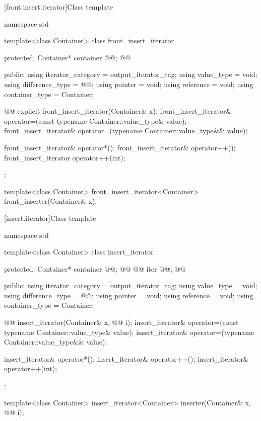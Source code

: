 [front.insert.iterator]{Class template }



%
\begin{codeblock}
namespace std {
  template<class Container>
  class front_insert_iterator {
  protected:
    Container* container @@; @\added{// \expos}@

  public:
    using iterator_category = output_iterator_tag;
    using value_type        = void;
    using difference_type   = @@;
    using pointer           = void;
    using reference         = void;
    using container_type    = Container;

    @@
    explicit front_insert_iterator(Container& x);
    front_insert_iterator& operator=(const typename Container::value_type& value);
    front_insert_iterator& operator=(typename Container::value_type&& value);

    front_insert_iterator& operator*();
    front_insert_iterator& operator++();
    front_insert_iterator  operator++(int);
  };

  template<class Container>
    front_insert_iterator<Container> front_inserter(Container& x);
}
\end{codeblock}


[insert.iterator]{Class template }


%
\begin{codeblock}
namespace std {
  template<class Container>
  class insert_iterator {
  protected:
    Container* container @@; @\added{// \expos}@
    @@ iter @\added{\{\}}@; @\added{// \expos}@

  public:
    using iterator_category = output_iterator_tag;
    using value_type        = void;
    using difference_type   = @@;
    using pointer           = void;
    using reference         = void;
    using container_type    = Container;

    @@
    insert_iterator(Container& x, @@ i);
    insert_iterator& operator=(const typename Container::value_type& value);
    insert_iterator& operator=(typename Container::value_type&& value);

    insert_iterator& operator*();
    insert_iterator& operator++();
    insert_iterator& operator++(int);
  };

  template<class Container>
    insert_iterator<Container> inserter(Container& x, @@ i);
}
\end{codeblock}

